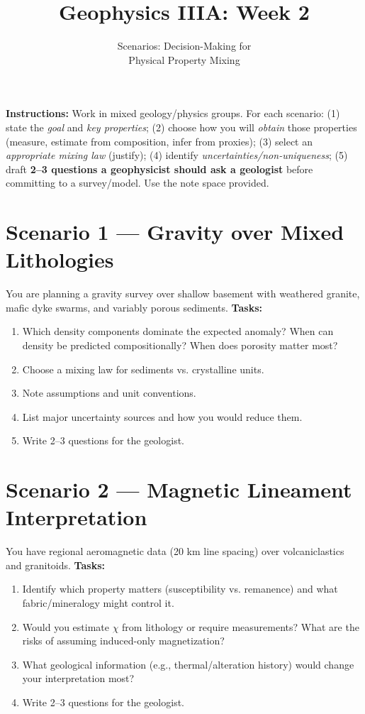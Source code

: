 \documentclass[11pt,a4paper]{article}
\title{Geophysics IIIA: Week 2}
\author{Scenarios: Decision-Making for\\ Physical Property Mixing}
\date{}
\begin{document}
\maketitle
\noindent\textbf{Instructions:} Work in mixed geology/physics groups. For each scenario: (1) state the \emph{goal} and \emph{key properties}; (2) choose how you will \emph{obtain} those properties (measure, estimate from composition, infer from proxies); (3) select an \emph{appropriate mixing law} (justify); (4) identify \emph{uncertainties/non-uniqueness}; (5) draft \textbf{2--3 questions a geophysicist should ask a geologist} before committing to a survey/model. Use the note space provided.

\section*{Scenario 1 --- Gravity over Mixed Lithologies}
You are planning a gravity survey over shallow basement with weathered granite, mafic dyke swarms, and variably porous sediments.\newline
\textbf{Tasks:}
\begin{enumerate}[leftmargin=*]
  \item Which density components dominate the expected anomaly? When can density be predicted compositionally? When does porosity matter most?
  \item Choose a mixing law for sediments vs. crystalline units.
  \item Note assumptions and unit conventions.
  \item List major uncertainty sources and how you would reduce them.
  \item Write 2--3 questions for the geologist.
\end{enumerate}
\vspace{16pt}

\section*{Scenario 2 --- Magnetic Lineament Interpretation}
You have regional aeromagnetic data (20 km line spacing) over volcaniclastics and granitoids.\newline
\textbf{Tasks:}
\begin{enumerate}[leftmargin=*]
  \item Identify which property matters (susceptibility vs. remanence) and what fabric/mineralogy might control it.
  \item Would you estimate $\chi$ from lithology or require measurements? What are the risks of assuming induced-only magnetization?
  \item What geological information (e.g., thermal/alteration history) would change your interpretation most?
  \item Write 2--3 questions for the geologist.
\end{enumerate}
\vspace{16pt}
\end{document}
